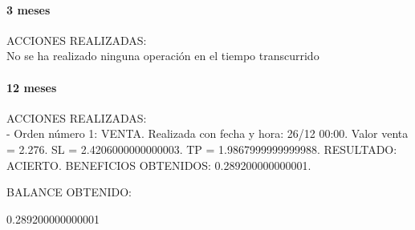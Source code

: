 \paragraph{3 meses}

ACCIONES REALIZADAS:\\

No se ha realizado ninguna operación en el tiempo transcurrido

\paragraph{12 meses}

ACCIONES REALIZADAS:\\

- Orden número 1: VENTA. Realizada con fecha y hora: 26/12 00:00. Valor venta = 2.276. SL = 2.4206000000000003. TP = 1.9867999999999988. RESULTADO: ACIERTO. BENEFICIOS OBTENIDOS: 0.289200000000001.\newline


\color{blue}
BALANCE OBTENIDO:\newline

0.289200000000001\newline
\color{black}
